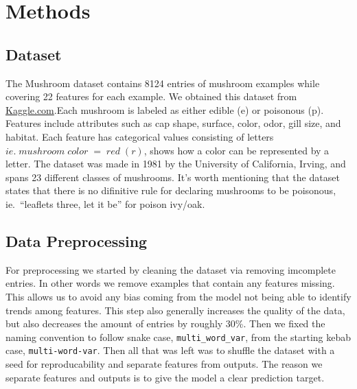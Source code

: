 \documentclass[conference]{IEEEtran}
\begin{document}
\section{Methods}
\subsection{Dataset}
    The Mushroom dataset contains 8124 entries of mushroom examples while covering 22 features for each example. We obtained this dataset from \url{Kaggle.com}.Each mushroom is labeled as either edible (e) or poisonous (p). Features include attributes such as cap shape, surface, color, odor, gill size, and habitat. Each feature has categorical values consisting of letters $ie.\;mushroom\;color\;=\;red\;(r)$, shows how a color can be represented by a letter. The dataset was made in 1981 by the University of California, Irving, and spans 23 different classes of mushrooms. It's worth mentioning that the dataset states that there is no difinitive rule for declaring mushrooms to be poisonous, ie.\ ``leaflets three, let it be'' for poison ivy/oak. 

\subsection{Data Preprocessing}
    For preprocessing we started by cleaning the dataset via removing imcomplete entries. In other words we remove examples that contain any features missing. This allows us to avoid any bias coming from the model not being able to identify trends among features. This step also generally increases the quality of the data, but also decreases the amount of entries by roughly 30\%. Then we fixed the naming convention to follow snake case, \texttt{multi\_word\_var}, from the starting kebab case, \texttt{multi-word-var}. Then all that was left was to shuffle the dataset with a seed for reproducability and separate features from outputs. The reason we separate features and outputs is to give the model a clear prediction target.
\end{document}
